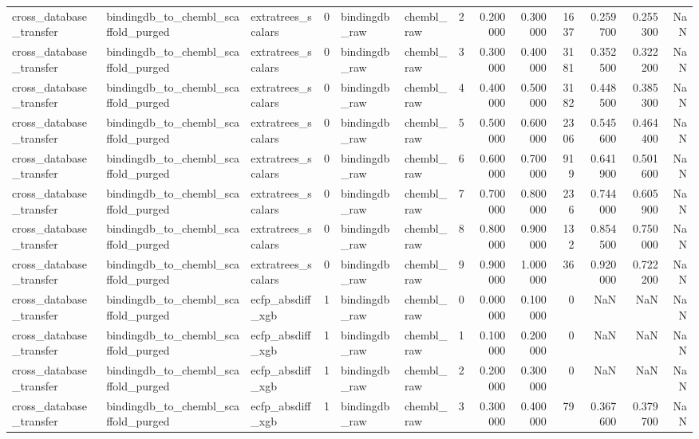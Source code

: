 \begin{longtable}{lllrllrrrrrrr}
cross\_database\_transfer & bindingdb\_to\_chembl\_scaffold\_purged & extratrees\_scalars & 0 & bindingdb\_raw & chembl\_raw & 2 & 0.200000 & 0.300000 & 1637 & 0.259700 & 0.255300 & NaN \\
cross\_database\_transfer & bindingdb\_to\_chembl\_scaffold\_purged & extratrees\_scalars & 0 & bindingdb\_raw & chembl\_raw & 3 & 0.300000 & 0.400000 & 3181 & 0.352500 & 0.322200 & NaN \\
cross\_database\_transfer & bindingdb\_to\_chembl\_scaffold\_purged & extratrees\_scalars & 0 & bindingdb\_raw & chembl\_raw & 4 & 0.400000 & 0.500000 & 3182 & 0.448500 & 0.385300 & NaN \\
cross\_database\_transfer & bindingdb\_to\_chembl\_scaffold\_purged & extratrees\_scalars & 0 & bindingdb\_raw & chembl\_raw & 5 & 0.500000 & 0.600000 & 2306 & 0.545600 & 0.464400 & NaN \\
cross\_database\_transfer & bindingdb\_to\_chembl\_scaffold\_purged & extratrees\_scalars & 0 & bindingdb\_raw & chembl\_raw & 6 & 0.600000 & 0.700000 & 919 & 0.641900 & 0.501600 & NaN \\
cross\_database\_transfer & bindingdb\_to\_chembl\_scaffold\_purged & extratrees\_scalars & 0 & bindingdb\_raw & chembl\_raw & 7 & 0.700000 & 0.800000 & 236 & 0.744000 & 0.605900 & NaN \\
cross\_database\_transfer & bindingdb\_to\_chembl\_scaffold\_purged & extratrees\_scalars & 0 & bindingdb\_raw & chembl\_raw & 8 & 0.800000 & 0.900000 & 132 & 0.854500 & 0.750000 & NaN \\
cross\_database\_transfer & bindingdb\_to\_chembl\_scaffold\_purged & extratrees\_scalars & 0 & bindingdb\_raw & chembl\_raw & 9 & 0.900000 & 1.000000 & 36 & 0.920000 & 0.722200 & NaN \\
cross\_database\_transfer & bindingdb\_to\_chembl\_scaffold\_purged & ecfp\_absdiff\_xgb & 1 & bindingdb\_raw & chembl\_raw & 0 & 0.000000 & 0.100000 & 0 & NaN & NaN & NaN \\
cross\_database\_transfer & bindingdb\_to\_chembl\_scaffold\_purged & ecfp\_absdiff\_xgb & 1 & bindingdb\_raw & chembl\_raw & 1 & 0.100000 & 0.200000 & 0 & NaN & NaN & NaN \\
cross\_database\_transfer & bindingdb\_to\_chembl\_scaffold\_purged & ecfp\_absdiff\_xgb & 1 & bindingdb\_raw & chembl\_raw & 2 & 0.200000 & 0.300000 & 0 & NaN & NaN & NaN \\
cross\_database\_transfer & bindingdb\_to\_chembl\_scaffold\_purged & ecfp\_absdiff\_xgb & 1 & bindingdb\_raw & chembl\_raw & 3 & 0.300000 & 0.400000 & 79 & 0.367600 & 0.379700 & NaN \\

\end{longtable}
